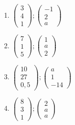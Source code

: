 \documentclass[12pt,a4paper,twoside,fleqn]{article}
\begin{document}
\begin{enumerate}
  \begin{multicols}{4}
    \begin{enumerate}
    \item $ 
      \begin{pmatrix}
        3\\4\\1
      \end{pmatrix};
      \begin{pmatrix}
        -1\\2\\a
      \end{pmatrix}
      $
    \item $
      \begin{pmatrix}
        7\\1\\5
      \end{pmatrix} ;
      \begin{pmatrix}
        1\\a\\2
      \end{pmatrix}
      $
    \item $
      \begin{pmatrix}
        10\\27\\0,5
      \end{pmatrix} ;
      \begin{pmatrix}
        a\\1\\-14
      \end{pmatrix}
      $
    \item $
      \begin{pmatrix}
        8\\3\\1
      \end{pmatrix};
      \begin{pmatrix}
        2\\a\\a
      \end{pmatrix}
      $
    \end{enumerate}
  \end{multicols}
\end{enumerate}\newpage
\end{document}
